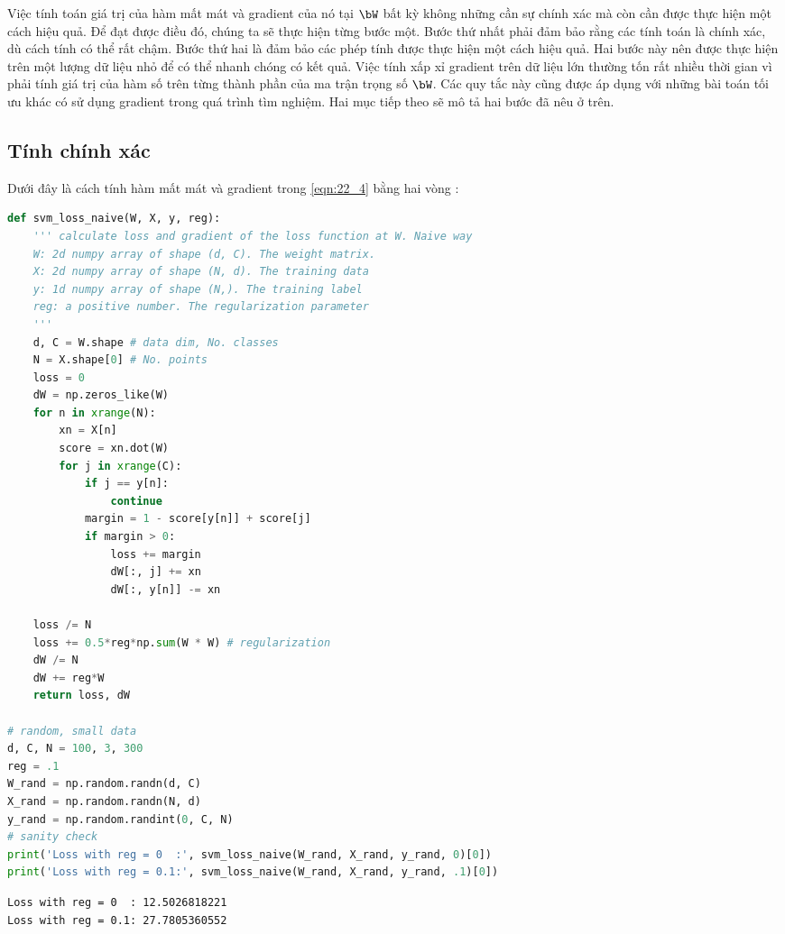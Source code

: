 Việc tính toán giá trị của hàm mất mát và gradient của nó tại $\bW$ bất kỳ không
những cần sự chính xác mà còn cần được thực hiện một cách hiệu quả. Để đạt được
điều đó, chúng ta sẽ thực hiện từng bước một. Bước thứ nhất phải đảm bảo rằng các
tính toán là {chính xác}, dù cách tính có thể rất chậm. Bước thứ hai là đảm bảo
các phép tính được thực hiện một cách hiệu quả. Hai bước này nên được thực hiện
trên một lượng dữ liệu nhỏ để có thể nhanh chóng có kết quả. Việc tính xấp xỉ
gradient trên dữ liệu lớn thường tốn rất nhiều thời gian vì phải tính giá trị
của hàm số trên từng thành phần của ma trận trọng số $\bW$. Các quy tắc này cũng
được áp dụng với những bài toán tối ưu khác có sử dụng gradient trong quá trình
tìm nghiệm. Hai mục tiếp theo sẽ mô tả hai bước đã nêu ở trên.
 
 
\subsection{Tính chính xác}
 
 
Dưới đây là cách tính hàm mất mát và gradient trong \eqref{eqn:22_4}
bằng hai vòng :
\begin{lstlisting}[language=Python]
def svm_loss_naive(W, X, y, reg):
    ''' calculate loss and gradient of the loss function at W. Naive way 
    W: 2d numpy array of shape (d, C). The weight matrix.
    X: 2d numpy array of shape (N, d). The training data 
    y: 1d numpy array of shape (N,). The training label
    reg: a positive number. The regularization parameter
    '''
    d, C = W.shape # data dim, No. classes
    N = X.shape[0] # No. points
    loss = 0 
    dW = np.zeros_like(W)
    for n in xrange(N):
        xn = X[n]
        score = xn.dot(W)
        for j in xrange(C):
            if j == y[n]:
                continue 
            margin = 1 - score[y[n]] + score[j]
            if margin > 0:
                loss += margin 
                dW[:, j] += xn 
                dW[:, y[n]] -= xn
    
    loss /= N 
    loss += 0.5*reg*np.sum(W * W) # regularization
    dW /= N 
    dW += reg*W
    return loss, dW  

# random, small data
d, C, N = 100, 3, 300
reg = .1 
W_rand = np.random.randn(d, C)
X_rand = np.random.randn(N, d)
y_rand = np.random.randint(0, C, N)
# sanity check
print('Loss with reg = 0  :', svm_loss_naive(W_rand, X_rand, y_rand, 0)[0])
print('Loss with reg = 0.1:', svm_loss_naive(W_rand, X_rand, y_rand, .1)[0])
\end{lstlisting}
\kq 
\begin{lstlisting}
Loss with reg = 0  : 12.5026818221
Loss with reg = 0.1: 27.7805360552
\end{lstlisting}
 
